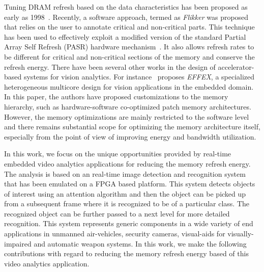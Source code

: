 Tuning DRAM refresh based on the data characteristics has been proposed as early as 1998~\cite{islped98}. Recently, a software approach, termed as \emph{Flikker} was proposed that relies on the user to annotate critical and non-critical parts. This technique has been used to effectively exploit a modified version of the standard Partial Array Self Refresh (PASR) hardware mechanism~\cite{Liu2011}. It also allows refresh rates to be different for critical and non-critical sections of the memory and conserve the refresh energy. 
There have been several other works in the design of accelerator-based systems for vision analytics. For instance~\cite{Effex} proposes \emph{EFFEX}, a specialized heterogeneous multicore design for vision applications in the embedded domain. In this paper, the authors have proposed customizations to the memory hierarchy, such as hardware-software co-optimized patch memory architectures. However, the memory optimizations are mainly restricted to the software level and there remains substantial scope for optimizing the memory architecture itself, especially from the point of view of improving energy and bandwidth utilization.

In this work, we focus on the unique opportunities provided by real-time embedded video analytics applications for reducing the memory refresh energy. The analysis is based on an real-time image detection and recognition system that has been emulated on a FPGA based platform. This system detects objects of interest using an attention algorithm and then the object can be picked up from a subsequent frame where it is recognized to be of a particular class. The recognized object can be further passed to a next level for more detailed recognition. This system represents generic components in a wide variety of end applications in unmanned air-vehicles, security cameras, visual-aids for visually-impaired and automatic weapon systems. In this work, we make the following contributions with regard to reducing the memory refresh energy based of this video analytics application.

